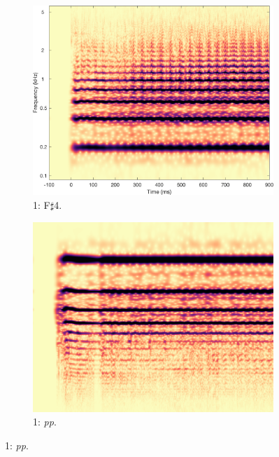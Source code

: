 \begin{figure}
        \begin{subfigure}{0.20\textwidth}
                \centering
                \includegraphics[width=\linewidth]{./figs/demo/TpC-flatt-Fsh4-mf.png}
                \caption*{1: F$\sharp$4.}
                \label{fig:TpC-flatt-Fsh4-mf-left}
        \end{subfigure}%
        \begin{subfigure}{0.20\textwidth}
                \centering
                \includegraphics[width=\linewidth]{./figs/demo/TpC-flatt-G4-pp.png}
                \caption*{1: \emph{pp}.}
                \label{fig:TpC-flatt-G4-pp}
        \end{subfigure}%


\end{figure}
